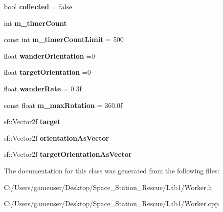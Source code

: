 \begin{DoxyCompactItemize}
bool {\bfseries collected} = false
\item 
\mbox{\label{class_worker_af5fe60a92d20f78e27a959d291167f2d}} 
int {\bfseries m\+\_\+timer\+Count}
\item 
\mbox{\label{class_worker_a3a430998cd1b2f5da3703714a74026ce}} 
const int {\bfseries m\+\_\+timer\+Count\+Limit} = 500
\item 
\mbox{\label{class_worker_a2a575469fd3437b8fe555221d157fd41}} 
float {\bfseries wander\+Orientation} =0
\item 
\mbox{\label{class_worker_a8c06b04da4e53ab6846363b894b370cf}} 
float {\bfseries target\+Orientation} =0
\item 
\mbox{\label{class_worker_a2df167342a7c3e601a49abfd64f4fbfe}} 
float {\bfseries wander\+Rate} = 0.\+3f
\item 
\mbox{\label{class_worker_a753f027804ccaa25888a136e183faca4}} 
const float {\bfseries m\+\_\+max\+Rotation} = 360.\+0f
\item 
\mbox{\label{class_worker_a5082ded2c0b017f2b90eff17c8280a0d}} 
sf\+::\+Vector2f {\bfseries target}
\item 
\mbox{\label{class_worker_a8de88f633cbe8e265ce3e5182c097087}} 
sf\+::\+Vector2f {\bfseries orientation\+As\+Vector}
\item 
\mbox{\label{class_worker_a027fd2c1a2333bd347b2332c8af68e00}} 
sf\+::\+Vector2f {\bfseries target\+Orientation\+As\+Vector}
\end{DoxyCompactItemize}


The documentation for this class was generated from the following files\+:\begin{DoxyCompactItemize}
\item 
C\+:/\+Users/gameuser/\+Desktop/\+Space\+\_\+\+Station\+\_\+\+Rescue/\+Lab1/Worker.\+h\item 
C\+:/\+Users/gameuser/\+Desktop/\+Space\+\_\+\+Station\+\_\+\+Rescue/\+Lab1/Worker.\+cpp\end{DoxyCompactItemize}
